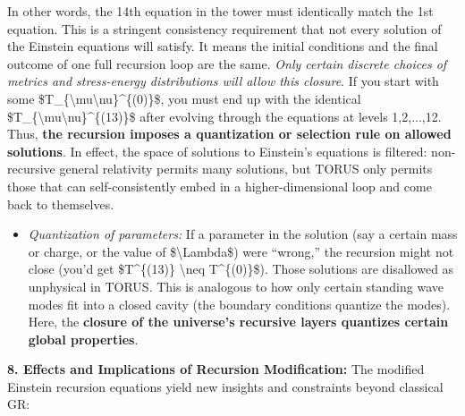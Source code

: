\documentclass[
]{article}
\begin{document}
In other words, the 14th equation in the tower must identically match
the 1st equation. This is a stringent consistency requirement that not
every solution of the Einstein equations will satisfy. It means the
initial conditions and the final outcome of one full recursion loop are
the same. \emph{Only certain discrete choices of metrics and
stress-energy distributions will allow this closure}. If you start with
some \$T\_\{\textbackslash mu\textbackslash nu\}\^{}\{(0)\}\$, you must
end up with the identical
\$T\_\{\textbackslash mu\textbackslash nu\}\^{}\{(13)\}\$ after evolving
through the equations at levels 1,2,...,12. Thus, \textbf{the recursion
imposes a quantization or selection rule on allowed
solutions}\hspace{0pt}. In effect, the space of solutions to Einstein's
equations is filtered: non-recursive general relativity permits many
solutions, but TORUS only permits those that can self-consistently embed
in a higher-dimensional loop and come back to themselves.

\begin{itemize}
\item
  \emph{Quantization of parameters:} If a parameter in the solution (say
  a certain mass or charge, or the value of \$\textbackslash Lambda\$)
  were ``wrong,'' the recursion might not close (you'd get
  \$T\^{}\{(13)\} \textbackslash neq T\^{}\{(0)\}\$). Those solutions
  are disallowed as unphysical in TORUS. This is analogous to how only
  certain standing wave modes fit into a closed cavity (the boundary
  conditions quantize the modes). Here, the \textbf{closure of the
  universe's recursive layers quantizes certain global properties}.
\end{itemize}

\textbf{8. Effects and Implications of Recursion Modification:} The
modified Einstein recursion equations yield new insights and constraints
beyond classical GR:
\end{document}
